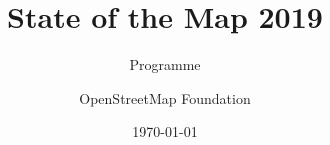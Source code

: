 \documentclass[version=last,toc=bib,toc=graduated,toc=index,toc=listof,fontsize=9pt,openany,twoside]{scrbook}
\title{State of the Map 2019}
\subtitle{Programme}
\author{OpenStreetMap Foundation}
\date{\today}
\begin{document}
\begin{titlepage}
  \null
\end{titlepage}
\pagestyle{cropmarksstyle}



%
%




%
%
%

%
\end{document}
